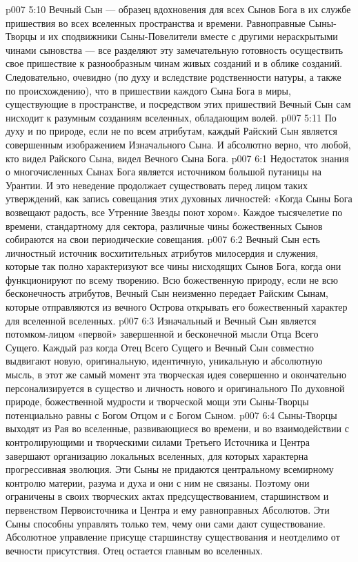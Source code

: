 \vs p007 5:10 \pc Вечный Сын --- образец вдохновения для всех Сынов Бога в их службе пришествия во всех вселенных пространства и времени. Равноправные Сыны\hyp{}Творцы и их сподвижники Сыны\hyp{}Повелители вместе с другими нераскрытыми чинами сыновства --- все разделяют эту замечательную готовность осуществить свое пришествие к разнообразным чинам живых созданий и в облике созданий. Следовательно, очевидно (по духу и вследствие родственности натуры, а также по происхождению), что в пришествии каждого Сына Бога в миры, существующие в пространстве, и посредством этих пришествий Вечный Сын сам нисходит к разумным созданиям вселенных, обладающим волей.
\vs p007 5:11 По духу и по природе, если не по всем атрибутам, каждый Райский Сын является совершенным изображением Изначального Сына. И абсолютно верно, что любой, кто видел Райского Сына, видел Вечного Сына Бога.
\vs p007 6:1 Недостаток знания о многочисленных Сынах Бога является источником большой путаницы на Урантии. И это неведение продолжает существовать перед лицом таких утверждений, как запись совещания этих духовных личностей: «Когда Сыны Бога возвещают радость, все Утренние Звезды поют хором». Каждое тысячелетие по времени, стандартному для сектора, различные чины божественных Сынов собираются на свои периодические совещания.
\vs p007 6:2 Вечный Сын есть личностный источник восхитительных атрибутов милосердия и служения, которые так полно характеризуют все чины нисходящих Сынов Бога, когда они функционируют по всему творению. Всю божественную природу, если не всю бесконечность атрибутов, Вечный Сын неизменно передает Райским Сынам, которые отправляются из вечного Острова открывать его божественный характер для вселенной вселенных.
\vs p007 6:3 \pc Изначальный и Вечный Сын является потомком\hyp{}лицом «первой» завершенной и бесконечной мысли Отца Всего Сущего. Каждый раз когда Отец Всего Сущего и Вечный Сын совместно выдвигают новую, оригинальную, идентичную, уникальную и абсолютную мысль, в этот же самый момент эта творческая идея совершенно и окончательно персонализируется в существо и личность нового и оригинального  По духовной природе, божественной мудрости и творческой мощи эти Сыны\hyp{}Творцы потенциально равны с Богом Отцом и с Богом Сыном.
\vs p007 6:4 Сыны\hyp{}Творцы выходят из Рая во вселенные, развивающиеся во времени, и во взаимодействии с контролирующими и творческими силами Третьего Источника и Центра завершают организацию локальных вселенных, для которых характерна прогрессивная эволюция. Эти Сыны не придаются центральному всемирному контролю материи, разума и духа и они с ним не связаны. Поэтому они ограничены в своих творческих актах предсуществованием, старшинством и первенством Первоисточника и Центра и ему равноправных Абсолютов. Эти Сыны способны управлять только тем, чему они сами дают существование. Абсолютное управление присуще старшинству существования и неотделимо от вечности присутствия. Отец остается главным во вселенных.
